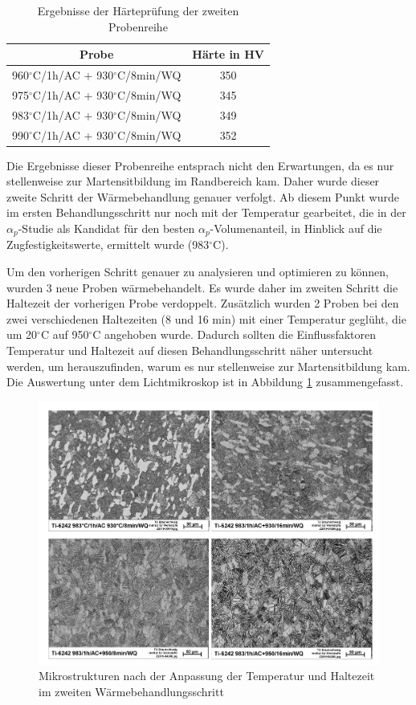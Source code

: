 \begin{table}[h]
	\centering
	\begin{tabular}{|c|c|}
		\hline 
		Probe & Härte in HV \\ 
		\hline 
		960$^\circ$C/1h/AC + 930$^\circ$C/8min/WQ & 350 \\ 
		\hline 
		975$^\circ$C/1h/AC + 930$^\circ$C/8min/WQ & 345 \\ 
		\hline 
		983$^\circ$C/1h/AC + 930$^\circ$C/8min/WQ & 349 \\ 
		\hline 
		990$^\circ$C/1h/AC + 930$^\circ$C/8min/WQ & 352 \\ 
		\hline 
	\end{tabular} 
	\caption{Ergebnisse der Härteprüfung der zweiten Probenreihe}
	\label{Tabelle 6}
\end{table}

Die Ergebnisse dieser Probenreihe entsprach nicht den Erwartungen, da es nur stellenweise zur Martensitbildung im Randbereich kam. Daher wurde dieser zweite Schritt der Wärmebehandlung genauer verfolgt. Ab diesem Punkt wurde im ersten Behandlungsschritt nur noch mit der Temperatur gearbeitet, die in der $\alpha_p$-Studie als Kandidat für den besten $\alpha_p$-Volumenanteil, in Hinblick auf die Zugfestigkeitswerte, ermittelt wurde (983$^\circ$C). 

Um den vorherigen Schritt genauer zu analysieren und optimieren zu können, wurden 3 neue Proben wärmebehandelt. Es wurde daher im zweiten Schritt die Haltezeit der vorherigen Probe verdoppelt. Zusätzlich wurden 2 Proben bei den zwei verschiedenen Haltezeiten (8 und 16 min) mit einer Temperatur geglüht, die um 20$^\circ$C auf 950$^\circ$C angehoben wurde. Dadurch sollten die Einflussfaktoren Temperatur und Haltezeit auf diesen Behandlungsschritt näher untersucht werden, um herauszufinden, warum es nur stellenweise zur Martensitbildung kam. Die Auswertung unter dem Lichtmikroskop ist in Abbildung \ref{fig:abbildung-14} zusammengefasst. 

\begin{figure}[h]
	\centering
	\includegraphics[width=1.0\linewidth]{./Bilder/Abbildung 14.png}
	\caption[Abbildung 14]{Mikrostrukturen nach der Anpassung der Temperatur und Haltezeit im zweiten Wärmebehandlungsschritt}
	\label{fig:abbildung-14}
\end{figure}

